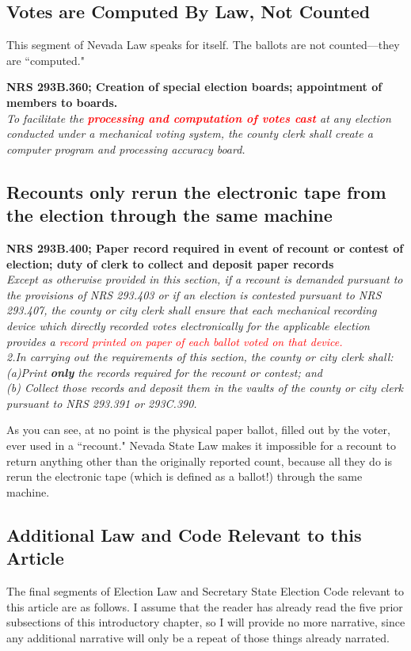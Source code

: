 \documentclass[preprint,13pt]{elsarticle}
\begin{document}
\subsection{Votes are Computed By Law, Not Counted}
This segment of Nevada Law speaks for itself. The ballots are not counted---they are ``computed."

\textbf{NRS 293B.360; Creation of special election boards; appointment of members to boards.}\\
\textit{To facilitate the \textcolor{red}{\textbf{processing and computation of votes cast}} at any election conducted under a mechanical voting system, the county clerk shall create a computer program and processing accuracy board.}

\subsection{Recounts only rerun the electronic tape from the election through the same machine}

\textbf{NRS 293B.400; Paper record required in event of recount or contest of election; duty of clerk to collect and deposit paper records}\\
\textit{Except as otherwise provided in this section, if a recount is demanded pursuant to the provisions of NRS 293.403 or if an election is contested pursuant to NRS 293.407, the county or city clerk shall ensure that each mechanical recording device which directly recorded votes electronically for the applicable election provides a \textcolor{red}{record printed on paper of each ballot voted on that device.}\\
2.In carrying out the requirements of this section, the county or city clerk shall:\\
(a)Print \textbf{only} the records required for the recount or contest; and\\
(b) Collect those records and deposit them in the vaults of the county or city clerk pursuant to NRS 293.391 or 293C.390.}

As you can see, at no point is the physical paper ballot, filled out by the voter, ever used in a ``recount." Nevada State Law makes it impossible for a recount to return anything other than the originally reported count, because all they do is rerun the electronic tape (which is defined as a ballot!) through the same machine.

\subsection{Additional Law and Code Relevant to this Article}
The final segments of Election Law and Secretary State Election Code relevant to this article are as follows. I assume that the reader has already read the five prior subsections of this introductory chapter, so I will provide no more narrative, since any additional narrative will only be a repeat of those things already narrated.
\end{document}
